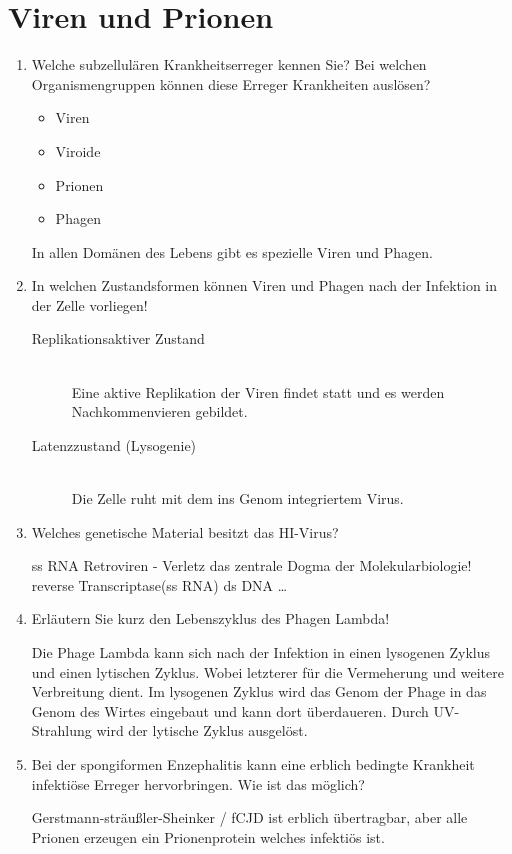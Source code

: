 \section{Viren und Prionen}
\begin{enumerate}
	\item Welche subzellulären Krankheitserreger kennen Sie? Bei welchen Organismengruppen können diese Erreger Krankheiten auslösen?
		
		\begin{itemize}
			\item Viren
			\item Viroide
			\item Prionen
			\item Phagen
		\end{itemize}
		
		In allen Domänen des Lebens gibt es spezielle Viren und Phagen.

	\item In welchen Zustandsformen können Viren und Phagen nach der Infektion in der Zelle vorliegen!

		\begin{description}
			\item[Replikationsaktiver Zustand] \hfill \\
				Eine aktive Replikation der Viren findet statt und es werden Nachkommenvieren gebildet.
			\item[Latenzzustand (Lysogenie)] \hfill \\
				Die Zelle ruht mit dem ins Genom integriertem Virus.
		\end{description}

	\item Welches genetische Material besitzt das HI-Virus? 
		
		ss RNA Retroviren - Verletz das zentrale Dogma der Molekularbiologie!\\
		\vspace{1cm}
		reverse Transcriptase(ss RNA) \textrightarrow ds DNA \ldots

	\item Erläutern Sie kurz den Lebenszyklus des Phagen Lambda!

		Die Phage Lambda kann sich nach der Infektion in einen lysogenen Zyklus
		und einen lytischen Zyklus.
		Wobei letzterer für die Vermeherung und weitere Verbreitung dient.
		Im lysogenen Zyklus wird das Genom der Phage in das Genom des Wirtes eingebaut und kann dort überdaueren.
		Durch UV-Strahlung wird der lytische Zyklus ausgelöst.

	\item Bei der spongiformen Enzephalitis kann eine erblich bedingte Krankheit infektiöse Erreger hervorbringen. Wie ist das möglich?
		
		Gerstmann-sträußler-Sheinker / fCJD ist erblich übertragbar,
		aber alle Prionen erzeugen ein Prionenprotein welches infektiös ist.

\end{enumerate}
